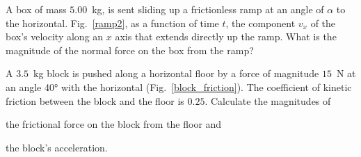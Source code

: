 \begin{problem}\label{prb:ramp2}
	A box of mass $5.00$~\si{\kilo\gram}, is sent sliding up a frictionless ramp at an angle of $\alpha$ to the horizontal. Fig.~\ref{ramp2}, as a function of time $t$, the component $v_x$ of the box's velocity along an
	$x$ axis that extends directly up the ramp. What is the magnitude of the normal force on the box from the ramp?
\end{problem}



\begin{problem}\label{prb:block_friction}
	A $3.5$~\si{\kilo\gram} block is pushed along a horizontal floor by a force of magnitude $15$~\si{\newton} at an angle \ang{40} with the horizontal (Fig.~\ref{block_friction}). The coefficient of kinetic friction between the block and the floor is $0.25$. Calculate the magnitudes of 
	\begin{enumerate*}[label = (\alph*)]
		\item the frictional force on the block from the floor and
		\item the block's acceleration.
	\end{enumerate*}
\end{problem}


